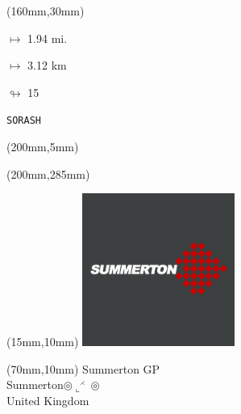 \begin{textblock*}{40mm}(160mm,30mm)%
\Large
\par$\mapsto$ 1.94 mi.
\par$\mapsto$ 3.12 km
\par$\looparrowright$ 15
\par\hfill\tiny\tt SORASH\\
\end{textblock*}
\begin{textblock*}{20mm}(200mm,5mm)%
\fbox{\thepage}
\label{SORASH}
\end{textblock*}
\begin{textblock*}{20mm}(200mm,285mm)%
\fbox{\thepage}
\end{textblock*}

\null\newpage
\begin{textblock*}{50mm}(15mm,10mm)%
\includegraphics[width=50mm]{LG/SUMM.png}
\end{textblock*}
\begin{textblock*}{130mm}(70mm,10mm)%
{\fontsize{20}{20}\selectfont Summerton GP\\}
{\fontsize{16}{16}\selectfont Summerton\hfill $\circledcirc\llcorner^{\rightthreetimes}\circledcirc$\\}
{\fontsize{12}{12}\selectfont United Kingdom\\}
\end{textblock*}
